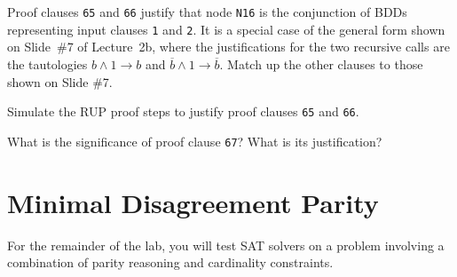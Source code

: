 \begin{choice}
\item
Proof clauses \texttt{65} and \texttt{66} justify that
node \texttt{N16} is the conjunction of BDDs representing input
clauses \texttt{1} and \texttt{2}.  It is a special case of the
general form shown on Slide~\#7 of Lecture~2b, where the
justifications for the two recursive calls are the tautologies
$b \land 1 \rightarrow b$ and $\overline{b} \land 1 \rightarrow \overline{b}$.
Match up the other clauses to those shown on Slide \#7.


\item 
Simulate the RUP proof steps to justify proof clauses \texttt{65} and \texttt{66}.


\item
What is the significance of proof clause \texttt{67}?  What is its justification?

\end{choice}

\newpage
\section*{Minimal Disagreement Parity}

\newcommand{\ints}[1]{{\cal N}_{#1}}
\newcommand{\bset}{{\cal B}}


For the remainder of the lab, you will test SAT solvers on a problem
involving a combination of parity reasoning and cardinality
constraints.

